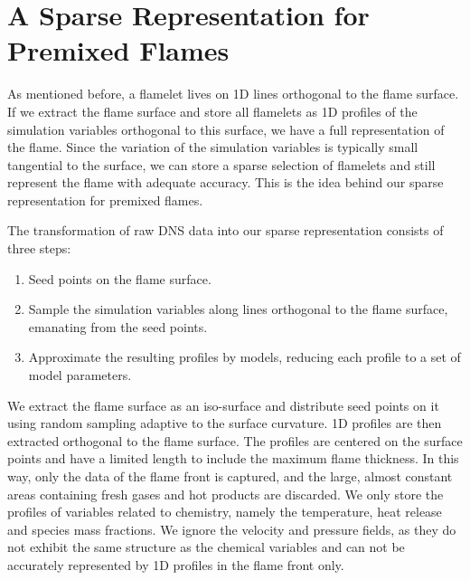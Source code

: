 \section{A Sparse Representation for Premixed Flames}
\label{sec:compression}
%
As mentioned before, a flamelet lives on \ac{1D} lines orthogonal to the flame
surface.
%
If we extract the flame surface and store all flamelets as \ac{1D} profiles of
the simulation variables orthogonal to this surface, we have a full
representation of the flame.
%
Since the variation of the simulation variables is typically small tangential to
the surface, we can store a sparse selection of flamelets and still represent
the flame with adequate accuracy.
%
This is the idea behind our sparse representation for premixed flames.
%

%
The transformation of raw \ac{DNS} data into our sparse representation consists
of three steps:
%
\begin{enumerate}
	\item Seed points on the flame surface.
	\item Sample the simulation variables along lines orthogonal to the flame
	surface, emanating from the seed points.
	\item Approximate the resulting profiles by models, reducing each profile to
	a set of model parameters.
\end{enumerate}
%

%
We extract the flame surface as an iso-surface and distribute seed points on it
using random sampling adaptive to the surface curvature.
%
\ac{1D} profiles are then extracted orthogonal to the flame surface.
%
The profiles are centered on the surface points and have a limited length to
include the maximum flame thickness.
%
In this way, only the data of the flame front is captured, and the large, almost
constant areas containing fresh gases and hot products are discarded.
%
We only store the profiles of variables related to chemistry, namely the
temperature, heat release and species mass fractions.
%
We ignore the velocity and pressure fields, as they do not exhibit the same
structure as the chemical variables and can not be accurately represented by
\ac{1D} profiles in the flame front only.
%

